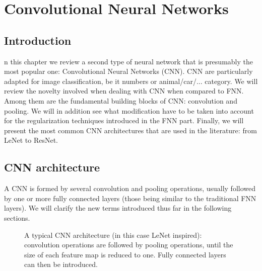 \chapter{Convolutional Neural Networks} \label{sec:chapterCNN}

\minitoc

\section{Introduction}

n this chapter we review a second type of neural network that is presumably the most popular one: Convolutional Neural Networks (CNN). CNN are particularly adapted for image classification, be it numbers or animal/car/... category. We will review the novelty involved when dealing with CNN when compared to FNN. Among them are the fundamental building blocks of CNN: convolution and pooling. We will in addition see what modification have to be taken into account for the regularization techniques introduced in the FNN part. Finally, we will present the most common CNN architectures that are used in the literature: from LeNet to ResNet.


\section{CNN architecture}


A CNN is formed by several convolution and pooling operations, usually followed by one or more fully connected layers (those being similar to the traditional FNN layers). We will clarify the new terms introduced thus far in the following sections.


\begin{figure}[H]
\begin{center}
\caption{\label{fig:lenet-CNN}A typical CNN architecture (in this case LeNet inspired): convolution operations are followed by pooling operations, until the size of each feature map is reduced to one. Fully connected layers can then be introduced.}
\end{center}
\end{figure}

